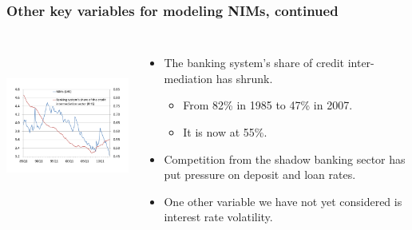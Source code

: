 \documentclass[handout]{beamer}
\begin{document}
\begin{frame}
\frametitle{Other key variables for modeling NIMs, continued}

\begin{columns}[4cm]

\column{7.2cm}
\includegraphics[height=5.4cm,width=7.2cm]{nims_competition_crop.pdf}

\column{4.8cm}
\begin{itemize}
\item\vspace{0.0in} The banking system's share of credit inter- mediation has shrunk.
\begin{itemize}
\item \vspace{0.05in} From 82\% in 1985 to 47\% in 2007.
\item \vspace{0.05in} It is now at 55\%.
\end{itemize}
\item \vspace{0.125in} Competition from the shadow banking sector has put pressure on deposit and loan rates.
\item \vspace{0.125in} One other variable we have not yet considered is interest rate volatility.
\end{itemize}
\end{columns}
\end{frame}
\end{document}
